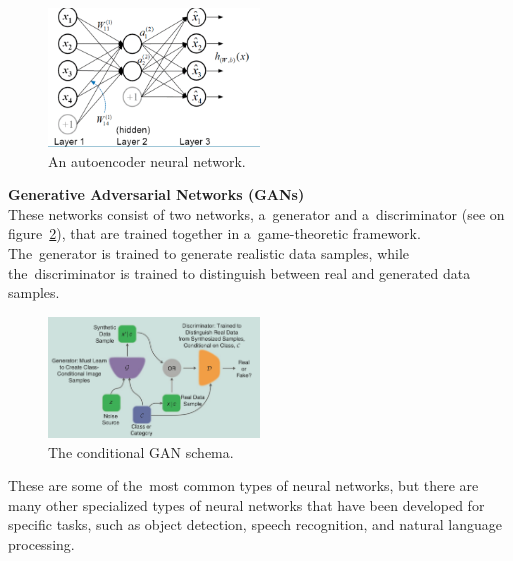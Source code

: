 \documentclass[12pt]{article}
\begin{document}
    \begin{center}
        \begin{figure}[!ht]
            \centering
            \includegraphics[width=0.5\textwidth]{figures/ann}
            \caption{An autoencoder neural network. \cite{luo2018distributed}}
            \label{fig:ann}
        \end{figure}
    \end{center}
    \textbf{Generative Adversarial Networks (GANs)}\\
    These networks consist of two networks, a~generator and a~discriminator (see on figure~\ref{fig:gan}), that are trained together in a~game-theoretic framework. The~generator is trained to generate realistic data samples, while the~discriminator is trained to distinguish between real and generated data samples.
    \begin{center}
        \begin{figure}[!ht]
            \centering
            \includegraphics[width=0.5\textwidth]{figures/gan}
            \caption{The conditional GAN schema. \cite{creswell2018generative}}
            \label{fig:gan}
        \end{figure}
    \end{center}

    These are some of the~most common types of neural networks, but there are many other specialized types of neural networks that have been developed for specific tasks, such as object detection, speech recognition, and
natural language processing.\\
\end{document}
